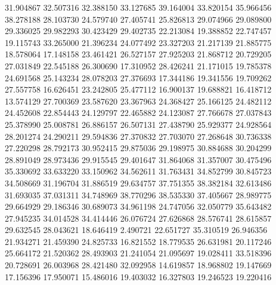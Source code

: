 31.904867
32.507316
32.388150
33.127685
39.164004
33.820154
35.966456
38.278188
28.103730
24.579740
27.405741
25.826813
29.074966
29.089800
29.336025
29.982293
30.423429
29.402735
22.213084
19.388852
22.747457
19.115743
33.265000
21.396234
24.077492
23.327203
21.217139
21.885775
18.578064
17.148158
23.461421
26.527157
27.925203
21.868712
20.729205
27.031849
22.545188
26.300690
17.310952
28.426241
21.171015
19.785378
24.691568
25.143234
28.078203
27.376693
17.344186
19.341556
19.709262
27.557758
16.626451
23.242805
25.477112
16.900137
19.688821
16.418712
13.574129
27.700369
23.587620
23.367963
24.368427
25.166125
24.482112
24.452608
22.854443
24.129797
22.465882
24.123087
27.766678
27.037843
25.378990
25.008781
26.886157
26.507131
27.438790
25.929377
24.928564
28.201274
24.290211
29.594836
27.370832
27.703070
27.268648
30.736338
27.220298
28.792173
30.952415
29.875036
29.198975
30.884688
30.204299
28.891049
28.973436
29.915545
29.401647
31.864068
31.357007
30.475496
35.330692
33.633220
33.150962
34.562611
31.763431
34.852799
30.845723
34.508669
31.196704
31.886519
29.634757
37.751355
38.382184
32.613486
31.693035
37.031311
34.748969
38.770296
38.535330
37.405667
28.989775
29.664929
29.186346
30.689073
34.961198
24.747056
32.050779
35.643482
27.945235
34.014528
34.414446
26.076724
27.626868
28.576741
28.615857
29.632545
28.043621
18.646419
2.490721
22.651727
35.310519
26.946356
21.934271
21.459390
24.825733
16.821552
18.779535
26.631981
20.117246
25.664172
21.520362
28.493903
21.241054
21.095697
19.028411
33.518396
20.728691
26.003968
28.421480
32.092958
14.619857
18.968802
19.147669
17.156396
17.950071
15.486016
19.403032
16.327803
19.246523
19.220416
